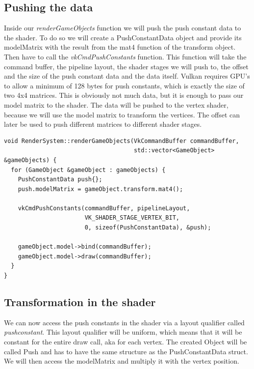 \documentclass[12pt]{report} \usepackage{preamble}
\begin{document}
\subsection{Pushing the data}

Inside our \textit{renderGameObjects} function we will push the push constant data to the shader. To do so we will create a PushConstantData object and provide its modelMatrix with the result from the mat4 function of the transform object.
Then have to call the \textit{vkCmdPushConstants} function. This function will take the command buffer, the pipeline layout, the shader stages we will push to, the offset and the size of the push constant data and the data itself.
Vulkan requires GPU's to allow a minimum of 128 bytes for push constants, which is exactly the size of two 4x4 matrices. This is obviously not much data, but it is enough to pass our model matrix to the shader.
The data will be pushed to the vertex shader, because we will use the model matrix to transform the vertices. The offset can later be used to push different matrices to different shader stages.

\begin{lstlisting}[Language=C++]
void RenderSystem::renderGameObjects(VkCommandBuffer commandBuffer,
                                     std::vector<GameObject> &gameObjects) {
  for (GameObject &gameObject : gameObjects) {
    PushConstantData push{};
    push.modelMatrix = gameObject.transform.mat4();

    vkCmdPushConstants(commandBuffer, pipelineLayout,
                       VK_SHADER_STAGE_VERTEX_BIT,
                       0, sizeof(PushConstantData), &push);

    gameObject.model->bind(commandBuffer);
    gameObject.model->draw(commandBuffer);
  }
}
\end{lstlisting}

\subsection{Transformation in the shader}

We can now access the push constants in the shader via a layout qualifier called \textit{push\textunderscore constant}. This layout qualifier will be uniform, which means that it will be constant for the entire draw call,
aka for each vertex. The created Object will be called Push and has to have the same structure as the PushConstantData struct. We will then access the modelMatrix and multiply it with the vertex position.
\end{document}
